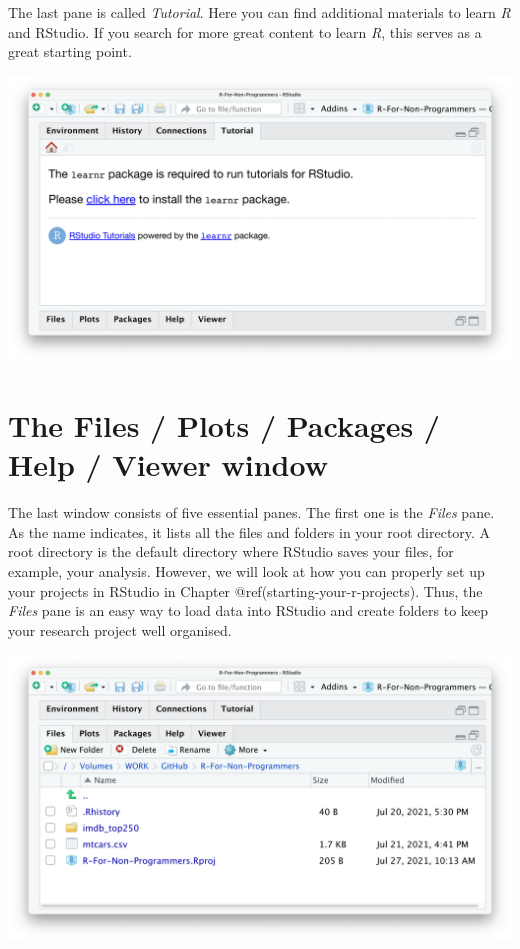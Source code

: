 \documentclass[
  letterpaper,
]{krantz}
\begin{document}
The last pane is called \emph{Tutorial}. Here you can find additional
materials to learn \emph{R} and RStudio. If you search for more great
content to learn \emph{R}, this serves as a great starting point.

\includegraphics{images/chapter_04_img/04_environment_history_etc/04_rstudio_tutorial.png}

\section{The Files / Plots / Packages / Help / Viewer
window}\label{the-files-plots-packages-help-viewer-window}

The last window consists of five essential panes. The first one is the
\emph{Files} pane. As the name indicates, it lists all the files and
folders in your root directory. A root directory is the default
directory where RStudio saves your files, for example, your analysis.
However, we will look at how you can properly set up your projects in
RStudio in Chapter @ref(starting-your-r-projects). Thus, the
\emph{Files} pane is an easy way to load data into RStudio and create
folders to keep your research project well organised.

\includegraphics{images/chapter_04_img/05_files_plots_etc/01_rstudio_files.png}
\end{document}
